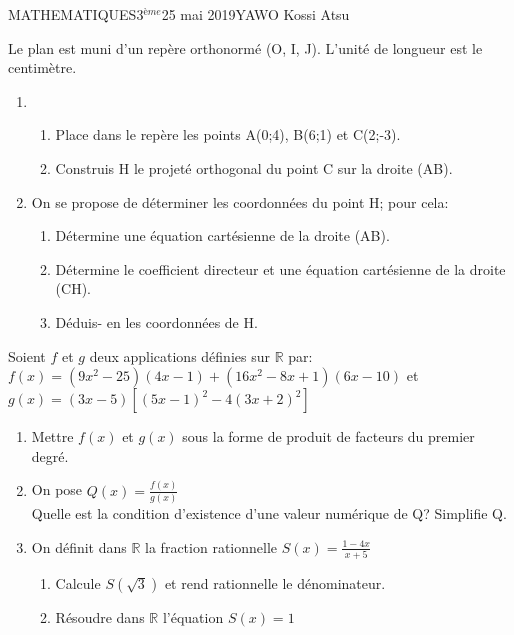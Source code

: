 \documentclass[12pt,a4paper]{book}
\newcommand{\prof}{YAWO Kossi Atsu}
\newcommand{\matiere}{MATHEMATIQUES}
\newcommand{\classe}{3$^{ème}$}
\begin{document}
\begin{td}{\matiere}{\classe}{25 mai 2019}{\prof}
\begin{exo}
Le plan est muni d'un repère orthonormé (O, I, J). L'unité de longueur est le centimètre.
\begin{enumerate}
\item \begin{enumerate}
\item Place dans le repère les points A(0;4), B(6;1) et C(2;-3).
\item Construis H le projeté orthogonal du point C sur la droite (AB).
\end{enumerate}
\item On se propose de déterminer les coordonnées du point H; pour cela:
\begin{enumerate}
\item Détermine une équation cartésienne de la droite (AB).
\item Détermine le coefficient directeur et une équation cartésienne de la droite (CH).
\item Déduis- en les coordonnées de H.
\end{enumerate}
\end{enumerate}

\vspace{0.3cm}
\end{exo}

\begin{exo}
Soient $f$ et $g$ deux applications définies sur $\mathbb{R}$ par:\\
$f(x)=(9x^2-25)(4x-1)+(16x^2-8x+1)(6x-10)$ et $g(x)=(3x-5)[(5x-1)^2-4(3x+2)^2]$
\begin{enumerate}
\item Mettre $f(x)$ et $g(x)$ sous la forme de produit de facteurs du premier degré.
\item On pose $Q(x)=\frac{f(x)}{g(x)}$\\
Quelle est la condition d'existence d'une valeur numérique de Q? Simplifie Q.
\item On définit dans $\mathbb{R}$ la fraction rationnelle $S(x)=\frac{1-4x}{x+5}$
\begin{enumerate}
\item Calcule $S(\sqrt{3})$ et rend rationnelle le dénominateur.
\item Résoudre dans $\mathbb{R}$ l'équation $S(x)=1$
\end{enumerate}
\end{enumerate}
\end{exo}

\end{td}
\end{document}
